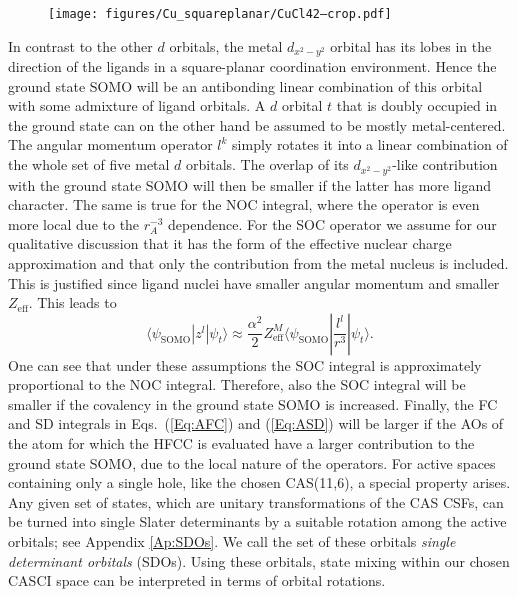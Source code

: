 \begin{figure}
\centering
{}
{\texttt{[image: figures/Cu\_squareplanar/CuCl42--crop.pdf]}}
\end{figure}

In contrast to the other $d$ orbitals, the metal ${d_{{x^2} - {y^2}}}$ orbital has its lobes in the direction of the ligands in a square-planar coordination environment. Hence the ground state SOMO will be an antibonding linear combination of this orbital with some admixture of ligand orbitals. A $d$ orbital $t$ that is doubly occupied in the ground state can on the other hand be assumed to be mostly metal-centered. The angular momentum operator ${l^k}$ simply rotates it into a linear combination of the whole set of five metal $d$ orbitals. The overlap of its ${d_{{x^2} - {y^2}}}$-like contribution with the ground state SOMO will then be smaller if the latter has more ligand character. The same is true for the NOC integral, where the operator is even more local due to the $r_A^{ - 3}$ dependence. For the SOC operator we assume for our qualitative discussion that it has the form of the effective nuclear charge approximation\cite{KosekGSM_1995_12764} and that only the contribution from the metal nucleus is included. This is justified since ligand nuclei have smaller angular momentum and smaller ${Z_{{\text{eff}}}}$. This leads to
	\begin{equation}
	\langle {\psi _{{\text{SOMO}}}}|{z^l}|{\psi _t}\rangle  \approx \frac{{{\alpha ^2}}}{2}Z_{{\text{eff}}}^M\langle {\psi _{{\text{SOMO}}}}|\frac{{{l^l}}}{{{r^3}}}|{\psi _t}\rangle. 
	\end{equation}
One can see that under these assumptions the SOC integral is approximately proportional to the NOC integral. Therefore, also the SOC integral will be smaller if the covalency in the ground state SOMO is increased. Finally, the FC and SD integrals in Eqs.~(\ref{Eq:AFC}) and (\ref{Eq:ASD}) will be larger if the AOs of the atom for which the HFCC is evaluated have a larger contribution to the ground state SOMO, due to the local nature of the operators. 
For active spaces containing only a single hole, like the chosen CAS(11,6), a special property arises. Any given set of states, which are unitary transformations of the CAS CSFs, can be turned into single Slater determinants by a suitable rotation among the active orbitals; see Appendix \ref{Ap:SDOs}.
We call the set of these orbitals \emph{single determinant orbitals} (SDOs). Using these orbitals, state mixing within our chosen CASCI space can be interpreted in terms of orbital rotations.

